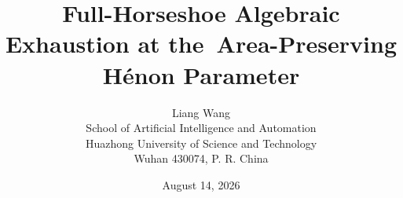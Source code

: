 \documentclass[11pt]{article}
\title{Full-Horseshoe Algebraic Exhaustion at the\
Area-Preserving H\'enon Parameter}
\author{Liang Wang\\
\small School of Artificial Intelligence and Automation\\[-1mm]
\small Huazhong University of Science and Technology\\[-1mm]
\small Wuhan 430074, P. R. China}
\date{August 14, 2026}
\theoremstyle{remark}
\begin{document}
\maketitle










\renewcommand{\bibfont}{\small}


\appendix

\end{document}
